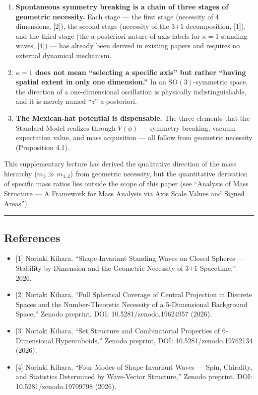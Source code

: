 \documentclass[
  a4paper,11pt]{article}
\providecommand{\tightlist}{%
  \setlength{\itemsep}{0pt}\setlength{\parskip}{0pt}}
\begin{document}
\begin{enumerate}
\def\labelenumi{\arabic{enumi}.}
\item
  \textbf{Spontaneous symmetry breaking is a chain of three stages of
  geometric necessity.} Each stage --- the first stage (necessity of 4
  dimensions, {[}2{]}), the second stage (necessity of the 3+1
  decomposition, {[}1{]}), and the third stage (the a posteriori nature
  of axis labels for \(\kappa = 1\) standing waves, {[}4{]}) --- has
  already been derived in existing papers and requires no external
  dynamical mechanism.
\item
  \textbf{\(\kappa = 1\) does not mean ``selecting a specific axis'' but
  rather ``having spatial extent in only one dimension.''} In an
  \(\mathrm{SO}(3)\)-symmetric space, the direction of a one-dimensional
  oscillation is physically indistinguishable, and it is merely named
  ``\(z\)'' a posteriori.
\item
  \textbf{The Mexican-hat potential is dispensable.} The three elements
  that the Standard Model realizes through \(V(\phi)\) --- symmetry
  breaking, vacuum expectation value, and mass acquisition --- all
  follow from geometric necessity (Proposition 4.1).
\end{enumerate}

This supplementary lecture has derived the qualitative direction of the
mass hierarchy (\(m_3 \gg m_{1,2}\)) from geometric necessity, but the
quantitative derivation of specific mass ratios lies outside the scope
of this paper (see ``Analysis of Mass Structure --- A Framework for Mass
Analysis via Axis Scale Values and Signed Areas'').

\begin{center}\rule{0.5\linewidth}{0.5pt}\end{center}

\subsection{References}\label{references}

\begin{itemize}
\tightlist
\item
  {[}1{]} Noriaki Kihara, ``Shape-Invariant Standing Waves on Closed
  Spheres --- Stability by Dimension and the Geometric Necessity of 3+1
  Spacetime,'' 2026.
\item
  {[}2{]} Noriaki Kihara, ``Full Spherical Coverage of Central
  Projection in Discrete Spaces and the Number-Theoretic Necessity of a
  5-Dimensional Background Space,'' Zenodo preprint, DOI:
  10.5281/zenodo.19624957 (2026).
\item
  {[}3{]} Noriaki Kihara, ``Set Structure and Combinatorial Properties
  of 6-Dimensional Hypercuboids,'' Zenodo preprint, DOI:
  10.5281/zenodo.19762134 (2026).
\item
  {[}4{]} Noriaki Kihara, ``Four Modes of Shape-Invariant Waves ---
  Spin, Chirality, and Statistics Determined by Wave-Vector Structure,''
  Zenodo preprint, DOI: 10.5281/zenodo.19709798 (2026).
\end{itemize}
\end{document}
